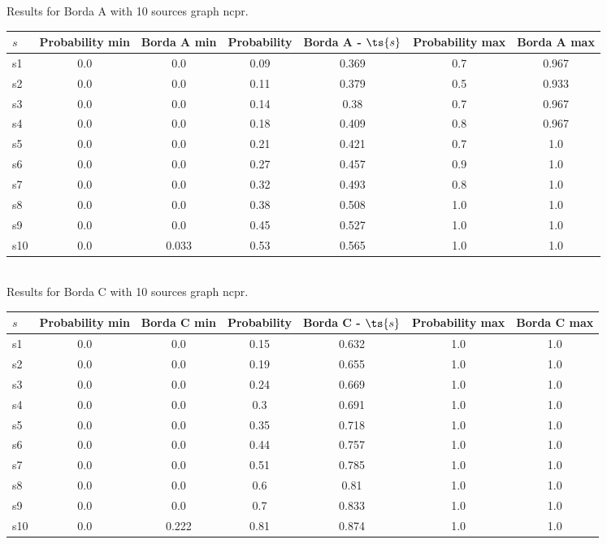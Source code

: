 \documentclass{article}
\begin{document}
\noindent Results for Borda A with 10 sources graph ncpr.

\noindent\begin{tabular}{|l|c|c|c|c|c|c|}
\hline
$s$& Probability min & Borda A min & Probability & Borda A - $\ts{s}$ & Probability max & Borda A max\\
\hline
s1 &0.0 & 0.0 & 0.09 & 0.369 & 0.7 & 0.967\\
\hline
s2 &0.0 & 0.0 & 0.11 & 0.379 & 0.5 & 0.933\\
\hline
s3 &0.0 & 0.0 & 0.14 & 0.38 & 0.7 & 0.967\\
\hline
s4 &0.0 & 0.0 & 0.18 & 0.409 & 0.8 & 0.967\\
\hline
s5 &0.0 & 0.0 & 0.21 & 0.421 & 0.7 & 1.0\\
\hline
s6 &0.0 & 0.0 & 0.27 & 0.457 & 0.9 & 1.0\\
\hline
s7 &0.0 & 0.0 & 0.32 & 0.493 & 0.8 & 1.0\\
\hline
s8 &0.0 & 0.0 & 0.38 & 0.508 & 1.0 & 1.0\\
\hline
s9 &0.0 & 0.0 & 0.45 & 0.527 & 1.0 & 1.0\\
\hline
s10 &0.0 & 0.033 & 0.53 & 0.565 & 1.0 & 1.0\\
\hline
\end{tabular}\\

\noindent Results for Borda C with 10 sources graph ncpr.

\noindent\begin{tabular}{|l|c|c|c|c|c|c|}
\hline
$s$& Probability min & Borda C min & Probability & Borda C - $\ts{s}$ & Probability max & Borda C max\\
\hline
s1 &0.0 & 0.0 & 0.15 & 0.632 & 1.0 & 1.0\\
\hline
s2 &0.0 & 0.0 & 0.19 & 0.655 & 1.0 & 1.0\\
\hline
s3 &0.0 & 0.0 & 0.24 & 0.669 & 1.0 & 1.0\\
\hline
s4 &0.0 & 0.0 & 0.3 & 0.691 & 1.0 & 1.0\\
\hline
s5 &0.0 & 0.0 & 0.35 & 0.718 & 1.0 & 1.0\\
\hline
s6 &0.0 & 0.0 & 0.44 & 0.757 & 1.0 & 1.0\\
\hline
s7 &0.0 & 0.0 & 0.51 & 0.785 & 1.0 & 1.0\\
\hline
s8 &0.0 & 0.0 & 0.6 & 0.81 & 1.0 & 1.0\\
\hline
s9 &0.0 & 0.0 & 0.7 & 0.833 & 1.0 & 1.0\\
\hline
s10 &0.0 & 0.222 & 0.81 & 0.874 & 1.0 & 1.0\\
\hline
\end{tabular}\\
\end{document}
